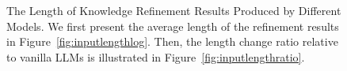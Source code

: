 \begin{figure}[t]
    \centering
    \caption{The Length of Knowledge Refinement Results Produced by Different Models. We first present the average length of the refinement results in Figure~\ref{fig:inputlengthlog}. Then, the length change ratio relative to vanilla LLMs is illustrated in Figure~\ref{fig:inputlengthratio}.
    }
    \label{fig:inputlength}
\end{figure}


